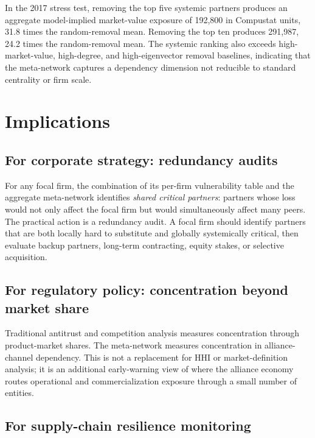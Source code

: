 \documentclass[11pt,letterpaper]{article}
\begin{document}
In the 2017 stress test, removing the top five systemic partners
produces an aggregate model-implied market-value exposure of 192{,}800
in Compustat units, 31.8 times the random-removal mean.  Removing the
top ten produces 291{,}987, 24.2 times the random-removal mean.  The
systemic ranking also exceeds high-market-value, high-degree, and
high-eigenvector removal baselines, indicating that the meta-network
captures a dependency dimension not reducible to standard centrality or
firm scale.

\section{Implications}
\label{sec:implications}

\subsection{For corporate strategy: redundancy audits}

For any focal firm, the combination of its per-firm vulnerability table
and the aggregate meta-network identifies \emph{shared critical
partners}: partners whose loss would not only affect the focal firm but
would simultaneously affect many peers.  The practical action is a
redundancy audit.  A focal firm should identify partners that are both
locally hard to substitute and globally systemically critical, then
evaluate backup partners, long-term contracting, equity stakes, or
selective acquisition.

\subsection{For regulatory policy: concentration beyond market share}

Traditional antitrust and competition analysis measures concentration
through product-market shares.  The meta-network measures concentration
in alliance-channel dependency.  This is not a replacement for HHI or
market-definition analysis; it is an additional early-warning view of
where the alliance economy routes operational and commercialization
exposure through a small number of entities.

\subsection{For supply-chain resilience monitoring}
\end{document}
